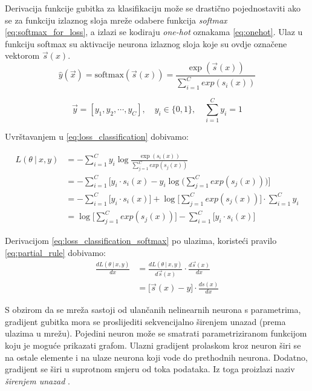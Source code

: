 \documentclass[times, utf8, numeric, diplomski]{fer}
\def\dfrac#1#2{\frac{d #1}{d #2}}
\def\probsep{\ |\ }
\begin{document}
Derivacija funkcije gubitka za klasifikaciju može se drastično pojednostaviti ako se za funkciju izlaznog sloja mreže odabere funkcija \textit{softmax} \eqref{eq:softmax_for_loss}, a izlazi se kodiraju \textit{one-hot} oznakama \eqref{eq:onehot}. Ulaz u funkciju softmax su aktivacije neurona izlaznog sloja koje su ovdje označene vektorom $\vec{s}(x)$.
\begin{equation}
\label{eq:softmax_for_loss}
\hat{y}(\vec{x}) = \text{softmax}(\vec{s}(x)) = \frac{\exp(\vec{s}(x))}{\sum_{i=1}^{C} exp(s_i(x))}
\end{equation}

\begin{equation}
\label{eq:onehot}
\vec{y}=[y_1, y_2, \cdots, y_C], \quad y_i \in \{0,1\}, \quad \sum_{i=1}^C y_i = 1
\end{equation}

Uvrštavanjem u \eqref{eq:loss_classification} dobivamo:

\begin{align}
\label{eq:loss_classification_softmax}
L(\theta \probsep x,y) &= - \sum_{i=1}^C y_i \log \frac{\exp(s_i(x))}{\sum_{j=1}^{C} exp(s_j(x))} \nonumber \\
&= - \sum_{i=1}^C \bigg[ y_i \cdot s_i(x) - y_i \log\big(\sum_{j=1}^{C} exp(s_j(x))\big) \bigg] \nonumber \\
&= - \sum_{i=1}^C \big[ y_i \cdot s_i(x) \big] + \log\big[\sum_{j=1}^{C} exp(s_j(x))\big] \cdot \sum_{i=1}^C y_i \nonumber \\
&= \log\big[\sum_{j=1}^{C} exp(s_j(x))\big] - \sum_{i=1}^C \big[ y_i \cdot s_i(x) \big]
\end{align}

Derivacijom \eqref{eq:loss_classification_softmax} po ulazima, koristeći pravilo \eqref{eq:partial_rule} dobivamo:
\begin{align}
\dfrac{L(\theta \probsep x,y)}{x} &= \dfrac{L(\theta \probsep x,y)}{\vec{s}(x)} \cdot \dfrac{\vec{s}(x)}{x} \nonumber \\
&= \bigg[ \vec{s}(x) - y \bigg] \cdot \dfrac{s(x)}{x}
\end{align}

S obzirom da se mreža sastoji od ulančanih nelinearnih neurona s parametrima, gradijent gubitka mora se proslijediti sekvencijalno širenjem unazad (prema ulazima u mrežu). Pojedini neuron može se smatrati parametriziranom funkcijom koju je moguće prikazati grafom. Ulazni gradijent prolaskom kroz neuron širi se na ostale elemente i na ulaze neurona koji vode do prethodnih neurona. Dodatno, gradijent se širi u suprotnom smjeru od toka podataka. Iz toga proizlazi naziv \textit{širenjem unazad} .
\end{document}
